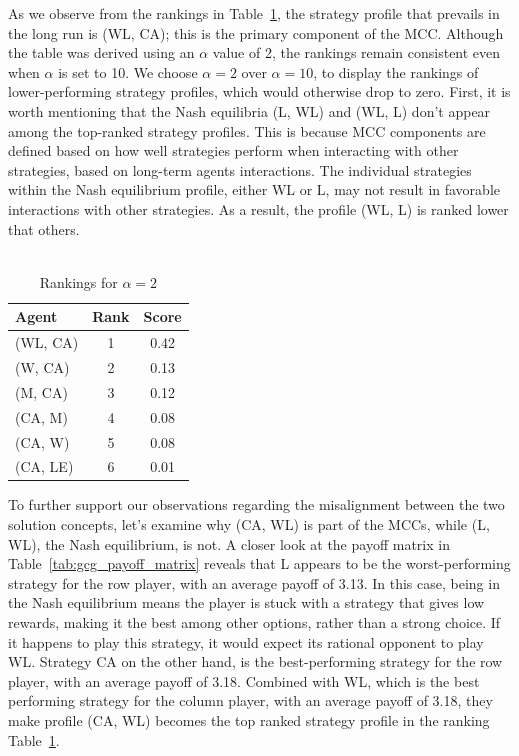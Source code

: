 \begin{flushleft}
\begin{flushleft}
        As we observe from the rankings in Table~\ref{tab:ranking_table}, the strategy profile that prevails in the long run is (WL, CA); this is the primary component of the MCC. Although the table was derived using an $\alpha$ value of 2, the rankings remain consistent even when $\alpha$ is set to 10. We choose $\alpha=2$ over $\alpha=10$, to display the rankings of lower-performing strategy profiles, which would otherwise drop to zero. First, it is worth mentioning that the Nash equilibria (L, WL) and (WL, L) don't appear among the top-ranked strategy profiles. This is because MCC components are defined based on how well strategies perform when interacting with other strategies, based on long-term agents interactions. The individual strategies within the Nash equilibrium profile, either WL or L, may not result in favorable interactions with other strategies. As a result, the profile (WL, L) is ranked lower that others.\\~\\
        \begin{table}[H]
            \centering
            \begin{tabular}{lcc}
                \hline
                \textbf{Agent} & \textbf{Rank} & \textbf{Score} \\
                \hline
                (WL, CA) & 1 & 0.42 \\
                (W, CA) & 2 & 0.13 \\
                (M, CA) & 3 & 0.12 \\
                (CA, M) & 4 & 0.08 \\
                (CA, W) & 5 & 0.08 \\
                (CA, LE) & 6 & 0.01 \\
                \hline
            \end{tabular}
            \vspace{0.5em}
            \caption{Rankings for $\alpha=2$}
            \label{tab:ranking_table}
        \end{table}

        To further support our observations regarding the misalignment between the two solution concepts, let's examine why (CA, WL) is part of the MCCs, while (L, WL), the Nash equilibrium, is not. A closer look at the payoff matrix in Table~\ref{tab:gcg_payoff_matrix} reveals that L appears to be the worst-performing strategy for the row player, with an average payoff of 3.13. In this case, being in the Nash equilibrium means the player is stuck with a strategy that gives low rewards, making it the best among other options, rather than a strong choice. If it happens to play this strategy, it would expect its rational opponent to play WL. Strategy CA on the other hand, is the best-performing strategy for the row player, with an average payoff of 3.18. Combined with WL, which is the best performing strategy for the column player, with an average payoff of 3.18, they make profile (CA, WL) becomes the top ranked strategy profile in the ranking Table~\ref{tab:ranking_table}.\\~\\


\end{flushleft}
\end{flushleft}
